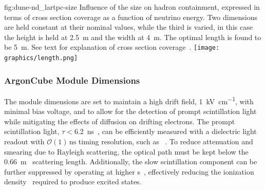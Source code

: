 \begin{dunefigure}{fig:dune-nd_lartpc-size}
{Influence of the  size on hadron containment, expressed in terms of cross section coverage as a function of neutrino energy.
		Two dimensions are held constant at their nominal values, while the third is varied, in this case the height is held at \SI{2.5}{\metre} and the width at \SI{4}{\metre}.
		The optimal length is found to be \SI{5}{\metre}.
		See text for explanation of cross section coverage~\cite{lartpcSizeChris}.}
	\texttt{[image: graphics/length.png]}
\end{dunefigure}

\subsubsection{ArgonCube Module Dimensions}

The     module dimensions are set to maintain a high drift field, \SI{1}{\kilo\volt\per\centi\metre}, with minimal bias voltage, and to allow for the detection of prompt scintillation light while mitigating the effects of diffusion on drifting electrons.
The prompt scintillation light, $\tau<$\SI{6.2}{\nano\second}~\cite{Heindl:2015yaa}, can be efficiently measured with a dielectric light readout with $\mathcal{O}\left(1\right)\,\mathrm{ns}$ timing resolution, such as ~\cite{Auger:2017flc}.
To reduce attenuation and smearing due to Rayleigh scattering, the optical path must be kept below the \SI{0.66}{\metre}~\cite{Grace:2015yta} scattering length.   Additionally, the slow scintillation component can be further suppressed by operating at higher \efield{}s~\cite{PhysRevB.20.3486}, effectively reducing the ionization density~\cite{PhysRevB.27.5279} required to produce excited states. 


